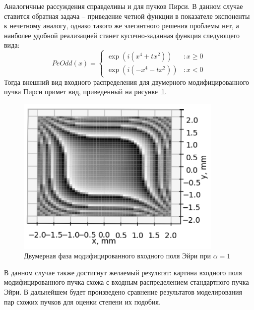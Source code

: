 {{    Аналогичные рассуждения справделивы и для пучков Пирси.
    В данном случае ставится обратная задача -- приведение четной функции в показателе экспоненты к нечетному аналогу,
    однако такого же элегантного решения проблемы нет, а наиболее удобной реализацией станет кусочно-заданная функция следующего вида:
    \[PeOdd(x) = \left\{
    \begin{array}{lr}
        \exp(i(x^4 + tx^2)) & : x \ge 0\\
        \exp(i(-x^4 - tx^2)) & : x < 0
    \end{array}
    \right.
    \]
    Тогда внешний вид входного распределения для двумерного модифицированного пучка Пирси примет вид, приведенный на рисунке~\ref{peodd_phase_2d}.
    \begin{figure}[H]
        \begin{center}
            \includegraphics[width=10cm]{plots/peoddphase_new}
            \caption{Двумерная фаза модифицированного входного поля Эйри при $\alpha  = 1$}
            \label{peodd_phase_2d}
        \end{center}
    \end{figure}
    В данном случае также достигнут желаемый результат: картина входного поля модифицированного пучка схожа с входным распределением стандартного пучка Эйри.
    В дальнейшем будет произведено сравнение результатов моделирования пар схожих пучков для оценки степени их подобия.
    }\label{subsec:изменение-характеристик-пространственных-спектров}
    }\label{sec:построение-входных-распределений-пучков-эйри,-пирси-и-их-модификаций-в-виде-пространственных-спектров}
    \newpage



